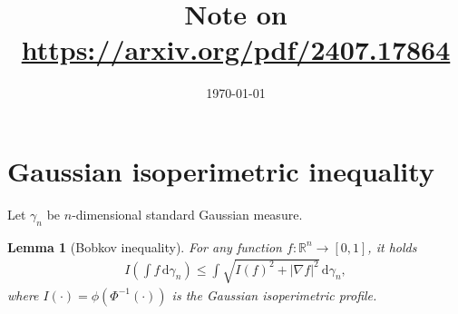 \documentclass[11pt]{article}
\title{Note on \hyperlink{https://arxiv.org/pdf/2407.17864}{https://arxiv.org/pdf/2407.17864}}
\date{\today}
\theoremstyle{plain}
\newtheorem{lemma}[theorem]{Lemma}
\theoremstyle{definition}
\theoremstyle{remark}
\newcommand{\dif}{\,\mathrm{d}}
\newcommand{\tuple}[1]{\left(#1\right)}
\newcommand{\tp}{\tuple}
\newcommand{\abs}[1]{\left\vert#1\right\vert}
\begin{document}
\maketitle

\section{Gaussian isoperimetric inequality}
Let $\gamma_n$ be $n$-dimensional standard Gaussian measure.

\begin{lemma}[Bobkov inequality]
    For any function $f: \mathbb{R}^n \to [0,1]$, it holds
    \begin{align*}
        I\tp{\int f \dif \gamma_n} \le \int \sqrt{I(f)^2 + \abs{\nabla f}^2} \dif \gamma_n,
    \end{align*}
    where $I(\cdot) = \phi(\Phi^{-1}(\cdot))$ is the Gaussian isoperimetric profile.
\end{lemma}
\end{document}
